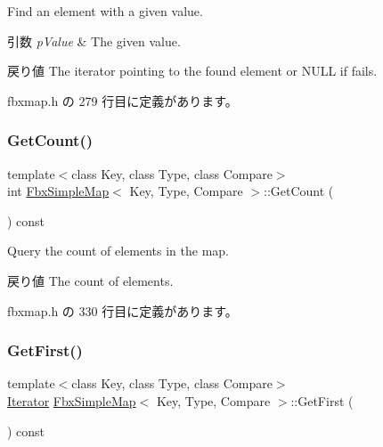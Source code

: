 Find an element with a given value. 
\begin{DoxyParams}{引数}
{\em p\+Value} & The given value. \\
\hline
\end{DoxyParams}
\begin{DoxyReturn}{戻り値}
The iterator pointing to the found element or N\+U\+LL if fails. 
\end{DoxyReturn}


 fbxmap.\+h の 279 行目に定義があります。

\mbox{\label{class_fbx_simple_map_aa1d257d7da92eece92cbf1b04a959ea3}} 
\subsubsection{\texorpdfstring{Get\+Count()}{GetCount()}}
{\footnotesize\ttfamily template$<$class Key, class Type, class Compare$>$ \\
int \hyperlink{class_fbx_simple_map}{Fbx\+Simple\+Map}$<$ Key, Type, Compare $>$\+::Get\+Count (\begin{DoxyParamCaption}{ }\end{DoxyParamCaption}) const\hspace{0.3cm}{\ttfamily [inline]}}

Query the count of elements in the map. \begin{DoxyReturn}{戻り値}
The count of elements. 
\end{DoxyReturn}


 fbxmap.\+h の 330 行目に定義があります。

\mbox{\label{class_fbx_simple_map_a39c8ffc7721d5934c6f01211f51fd24b}} 
\subsubsection{\texorpdfstring{Get\+First()}{GetFirst()}}
{\footnotesize\ttfamily template$<$class Key, class Type, class Compare$>$ \\
\hyperlink{class_fbx_simple_map_aaa589eb5e1ccdd11dffd018f3212e13e}{Iterator} \hyperlink{class_fbx_simple_map}{Fbx\+Simple\+Map}$<$ Key, Type, Compare $>$\+::Get\+First (\begin{DoxyParamCaption}{ }\end{DoxyParamCaption}) const\hspace{0.3cm}{\ttfamily [inline]}}

